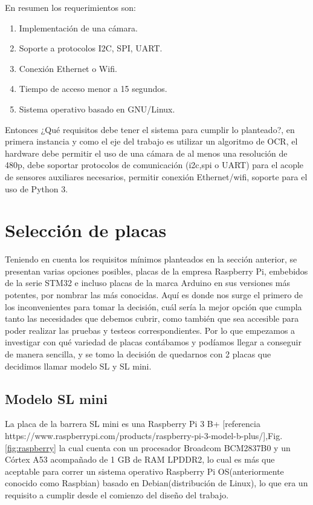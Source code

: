 En resumen los requerimientos son:

\begin{enumerate}
    \item Implementación de una cámara.
    \item Soporte a protocolos I2C, SPI, UART.
    \item Conexión Ethernet o Wifi.
    \item Tiempo de acceso menor a 15 segundos.
    \item Sistema operativo basado en GNU/Linux.
\end{enumerate}


Entonces ¿Qué requisitos debe tener el sistema para cumplir lo planteado?, en primera instancia y como el eje del trabajo
es utilizar un algoritmo de OCR, el hardware debe permitir el uso de una cámara de al menos una resolución de 480p, debe
soportar protocolos de comunicación (i2c,spi o UART) para el acople de sensores auxiliares necesarios, permitir conexión
Ethernet/wifi, soporte para el uso de Python 3.

\section{Selección de placas}
Teniendo en cuenta los requisitos mínimos planteados en la sección anterior, se presentan varias opciones posibles,
placas de la empresa Raspberry Pi, embebidos de la serie STM32 e incluso placas de la marca Arduino en sus versiones más
potentes, por nombrar las más conocidas. Aquí es donde nos surge el primero de los inconvenientes para tomar la decisión,
cuál sería la mejor opción que cumpla tanto las necesidades que debemos cubrir, como también que sea accesible para poder realizar las pruebas y testeos correspondientes.
Por lo que empezamos a investigar con qué variedad de placas contábamos y podíamos llegar a conseguir de manera sencilla,
y se tomo la decisión de quedarnos con 2 placas que decidimos llamar modelo SL y SL mini.

\subsection{Modelo SL mini}
La placa de la barrera SL mini es una Raspberry Pi 3 B+ [referencia https://www.raspberrypi.com/products/raspberry-pi-3-model-b-plus/],Fig.\ref{fig:raspberry} la cual cuenta con un procesador
Broadcom BCM2837B0 y un Córtex A53 acompañado de 1 GB de RAM LPDDR2, lo cual es más que aceptable para correr un sistema operativo Raspberry Pi
OS(anteriormente conocido como Raspbian) basado en Debian(distribución de Linux), lo que era un requisito a cumplir desde
el comienzo del diseño del trabajo.

